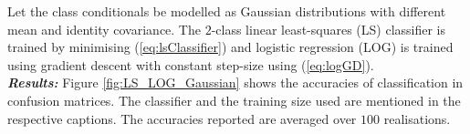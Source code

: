 \documentclass[12pt, a4 paper]{article}
\begin{document}

\label{prob:1.c}

Let the class conditionals be modelled as Gaussian distributions with different mean and identity covariance. The $2$-class linear least-squares (LS) classifier is trained by minimising (\ref{eq:lsClassifier}) and logistic regression (LOG) is trained using gradient descent with constant step-size using (\ref{eq:logGD}). \\

{\it \bfseries Results:} Figure \ref{fig:LS_LOG_Gaussian} shows the accuracies of classification in confusion matrices. The classifier and the training size used are mentioned in the respective captions. The accuracies reported are averaged over $100$ realisations. \\
\end{document}
